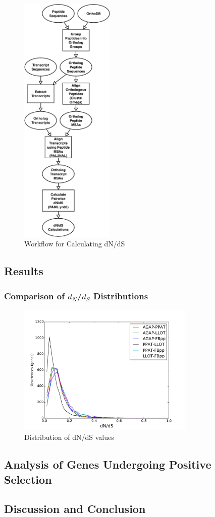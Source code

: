 \begin{figure}[H]
  \centering
  \includegraphics[width=0.4\textwidth]{figures/ka_ks/PAML_workflow}
  \caption{Workflow for Calculating dN/dS}
  \label{fig:ka-ks-workflow}
\end{figure}

\subsection{Results}

\subsubsection{Comparison of $d_N$/$d_S$ Distributions}
\begin{figure}[H]
  \centering
  \includegraphics[width=0.75\textwidth]{figures/ka_ks/dN_dS}
  \caption{Distribution of dN/dS values}
  \label{fig:dnds-distr}
\end{figure}

\subsection{Analysis of Genes Undergoing Positive Selection}
\subsection{Discussion and Conclusion}